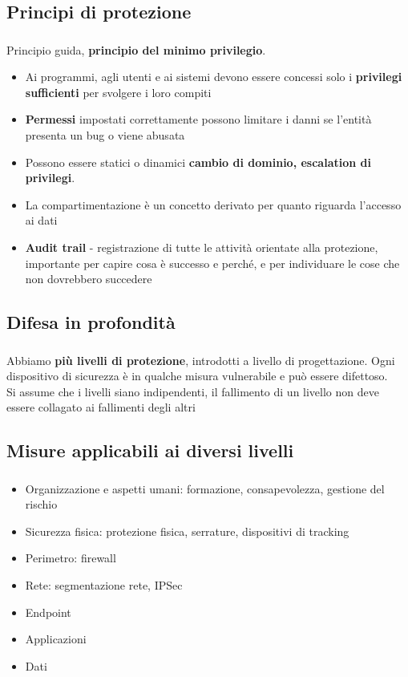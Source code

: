 \documentclass{beamer}
\newenvironment{mainframe}{
	\begin{frame}
		\frametitle{\insertsubsection}
		\framesubtitle{\insertsection}
	}{
	\end{frame}
}
\begin{document}
\subsection{Principi di protezione}
\begin{mainframe}
	Principio guida, \textbf{principio del minimo privilegio}.
	\begin{itemize}
		\item Ai programmi, agli utenti e ai sistemi devono essere concessi solo i \textbf{privilegi sufficienti} per svolgere i loro compiti
		\item \textbf{Permessi} impostati correttamente possono limitare i danni se l'entità presenta un bug o viene abusata
		\item Possono essere statici o dinamici \textbf{cambio di dominio, escalation di privilegi}.
		\item La compartimentazione è un concetto derivato per quanto riguarda l'accesso ai dati
		\item \textbf{Audit trail} - registrazione di tutte le attività orientate alla protezione, importante per capire cosa è successo e perché, e per individuare le cose che non dovrebbero succedere
	\end{itemize}
\end{mainframe}
\subsection{Difesa in profondità}
\begin{mainframe}
	Abbiamo \textbf{più livelli di protezione}, introdotti a livello di progettazione. Ogni dispositivo di sicurezza è in qualche misura vulnerabile e può essere difettoso.\\
	Si assume che i livelli siano indipendenti, il fallimento di un livello non deve essere collagato ai fallimenti degli altri
\end{mainframe}
\subsection{Misure applicabili ai diversi livelli}
\begin{mainframe}
	\begin{itemize}
		\item Organizzazione e aspetti umani: formazione, consapevolezza, gestione del rischio
		\item Sicurezza fisica: protezione fisica, serrature, dispositivi di tracking
		\item Perimetro: firewall
		\item Rete: segmentazione rete, IPSec
		\item Endpoint
		\item Applicazioni
		\item Dati
	\end{itemize}
\end{mainframe}
\end{document}
